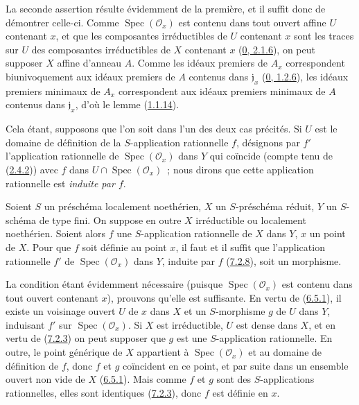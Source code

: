 La seconde assertion résulte évidemment de la première, et il suffit donc de
démontrer celle-ci. Comme $\operatorname{Spec}(\mathscr{O}_x)$ est contenu
dans tout ouvert affine $U$ contenant $x$, et que les composantes
irréductibles de $U$ contenant $x$ sont les traces sur $U$ des composantes
irréductibles de $X$ contenant $x$
(\hyperref[0.2.1.6-fr]{0, 2.1.6}), on peut supposer $X$ affine d'anneau $A$.
Comme les idéaux premiers de $A_x$ correspondent biunivoquement aux idéaux
premiers
de $A$ contenus dans $\mathfrak{j}_x$
(\hyperref[0.1.2.6-fr]{0, 1.2.6}), les idéaux premiers minimaux de $A_x$
correspondent aux idéaux premiers minimaux de $A$ contenus dans
$\mathfrak{j}_x$, d'où le lemme (\hyperref[I.1.1.14-fr]{1.1.14}).

Cela étant, supposons que l'on soit dans l'un des deux cas précités. Si $U$
est le domaine de définition de la $S$-application rationnelle $f$, désignons
par $f'$ l'application rationnelle de $\operatorname{Spec}(\mathscr{O}_x)$
dans $Y$ qui coïncide (compte tenu de (\hyperref[I.2.4.2-fr]{2.4.2})) avec
$f$ dans $U\cap\operatorname{Spec}(\mathscr{O}_x)$~; nous dirons que cette
application rationnelle est \emph{induite par $f$}.

\begin{proposition}[7.2.9]
\label{I.7.2.9-fr}
Soient $S$ un préschéma localement noethérien, $X$ un $S$-préschéma réduit,
$Y$ un $S$-schéma de type fini. On suppose en outre $X$ irréductible ou
localement noethérien. Soient alors $f$ une $S$-application rationnelle de
$X$ dans $Y$, $x$ un point de $X$. Pour que $f$ soit définie au point $x$,
il faut et il suffit que l'application rationnelle $f'$ de
$\operatorname{Spec}(\mathscr{O}_x)$ dans $Y$, induite par $f$
(\hyperref[I.7.2.8-fr]{7.2.8}), soit un morphisme.
\end{proposition}

La condition étant évidemment nécessaire (puisque
$\operatorname{Spec}(\mathscr{O}_x)$ est contenu dans tout ouvert contenant
$x$), prouvons qu'elle est suffisante. En vertu de
(\hyperref[I.6.5.1-fr]{6.5.1}), il existe un voisinage ouvert $U$ de $x$ dans
$X$ et un $S$-morphisme $g$ de $U$ dans $Y$, induisant $f'$ sur
$\operatorname{Spec}(\mathscr{O}_x)$. Si $X$ est irréductible, $U$ est dense
dans $X$, et en vertu de (\hyperref[I.7.2.3-fr]{7.2.3}) on peut supposer que
$g$ est une $S$-application rationnelle. En outre, le point générique de $X$
appartient à $\operatorname{Spec}(\mathscr{O}_x)$ et au domaine de définition
de $f$, donc $f$ et $g$ coïncident en ce point, et par suite dans un ensemble
ouvert non vide de $X$ (\hyperref[I.6.5.1-fr]{6.5.1}). Mais comme $f$ et $g$
sont des $S$-applications rationnelles, elles sont identiques
(\hyperref[I.7.2.3-fr]{7.2.3}), donc $f$ est définie en $x$.

